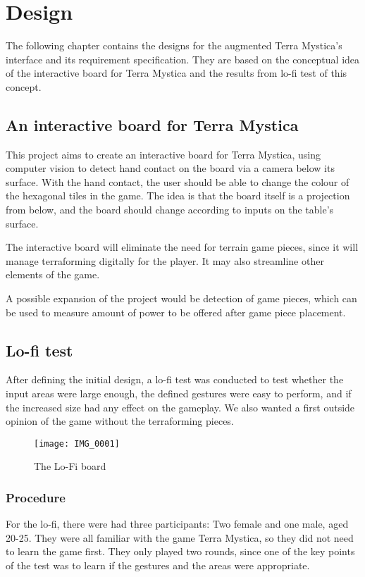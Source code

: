 \chapter{Design}\label{ch:design}
The following chapter contains the designs for the augmented Terra Mystica's interface and its requirement specification. They are based on the conceptual idea of the interactive board for Terra Mystica and the results  from lo-fi test of this concept.

\section{An interactive board for Terra Mystica}
This project aims to create an interactive board for Terra Mystica, using computer vision to detect hand contact on the board via a camera below its surface. With the hand contact, the user should be able to change the colour of the hexagonal tiles in the game. The idea is that the board itself is a projection from below, and the board should change according to inputs on the table's surface.

The interactive board will eliminate the need for terrain game pieces, since it will manage terraforming digitally for the player. It may also streamline other elements of the game.

A possible expansion of the project would be detection of game pieces, which can be used to measure amount of power to be offered after game piece placement.

\section{Lo-fi test}
After defining the initial design, a lo-fi test was conducted to test whether the input areas were large enough, the defined gestures were easy to perform, and if the increased size had any effect on the gameplay. We also wanted a first outside opinion of the game without the terraforming pieces.

\begin{figure}[!h]
\centering
\texttt{[image: IMG\_0001]}
\caption{The Lo-Fi board}
\end{figure}

\subsection{Procedure}
For the lo-fi, there were had three participants: Two female and one male, aged 20-25. 
They were all familiar with the game Terra Mystica, so they did not need to learn the game first. They only played two rounds, since one of the key points of the test was to learn if the gestures and the areas were appropriate. 

